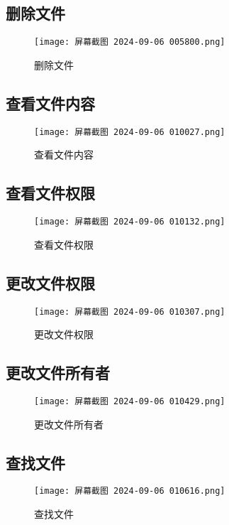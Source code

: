 \documentclass[a4paper, 12pt]{article}
\begin{document}
\subsection{删除文件}
\begin{figure}[H]
    \centering
    \texttt{[image: 屏幕截图 2024-09-06 005800.png]}
    \caption{删除文件}
\end{figure}

\subsection{查看文件内容}
\begin{figure}[H]
    \centering
    \texttt{[image: 屏幕截图 2024-09-06 010027.png]}
    \caption{查看文件内容}
\end{figure}

\subsection{查看文件权限}
\begin{figure}[H]
    \centering
    \texttt{[image: 屏幕截图 2024-09-06 010132.png]}
    \caption{查看文件权限}
\end{figure}

\subsection{更改文件权限}
\begin{figure}[H]
    \centering
    \texttt{[image: 屏幕截图 2024-09-06 010307.png]}
    \caption{更改文件权限}
\end{figure}

\subsection{更改文件所有者}
\begin{figure}[H]
    \centering
    \texttt{[image: 屏幕截图 2024-09-06 010429.png]}
    \caption{更改文件所有者}
\end{figure}

\subsection{查找文件}
\begin{figure}[H]
    \centering
    \texttt{[image: 屏幕截图 2024-09-06 010616.png]}
    \caption{查找文件}
\end{figure}
\end{document}
